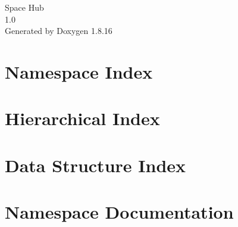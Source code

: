\let\mypdfximage\pdfximage\def\pdfximage{\immediate\mypdfximage}\documentclass[twoside]{book}
\newcommand{\+}{\discretionary{\mbox{\scriptsize$\hookleftarrow$}}{}{}}
\newcommand{\clearemptydoublepage}{%
  \newpage{\pagestyle{empty}\cleardoublepage}%
}
\begin{document}
\hypersetup{pageanchor=false,
             bookmarksnumbered=true,
             pdfencoding=unicode
            }
\begin{titlepage}
\vspace*{7cm}
\begin{center}%
{\Large Space Hub \\[1ex]\large 1.\+0 }\\
\vspace*{1cm}
{\large Generated by Doxygen 1.8.16}\\
\end{center}
\end{titlepage}
\clearemptydoublepage
{}
\tableofcontents
\clearemptydoublepage
{}
\hypersetup{pageanchor=true}

\chapter{Namespace Index}

\chapter{Hierarchical Index}

\chapter{Data Structure Index}

\chapter{Namespace Documentation}











\end{document}
